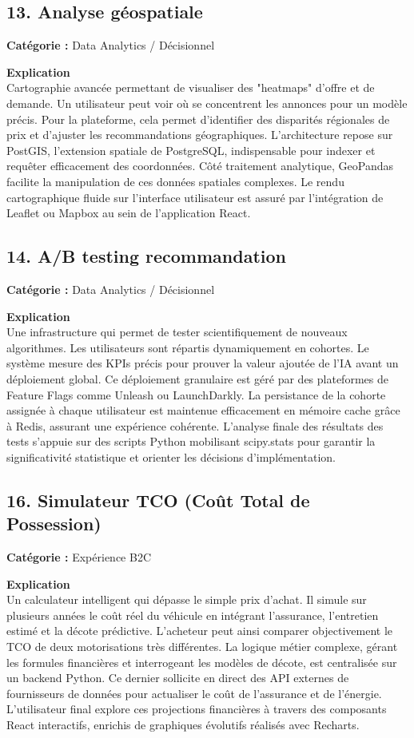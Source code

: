 \documentclass[11pt,a4paper]{article}
\begin{document}
\subsection{13. Analyse géospatiale}
\textbf{Catégorie :} Data Analytics / Décisionnel

\textbf{Explication}\\
Cartographie avancée permettant de visualiser des "heatmaps" d'offre et de demande. Un utilisateur peut voir où se concentrent les annonces pour un modèle précis. Pour la plateforme, cela permet d'identifier des disparités régionales de prix et d'ajuster les recommandations géographiques. L'architecture repose sur PostGIS, l'extension spatiale de PostgreSQL, indispensable pour indexer et requêter efficacement des coordonnées. Côté traitement analytique, GeoPandas facilite la manipulation de ces données spatiales complexes. Le rendu cartographique fluide sur l'interface utilisateur est assuré par l'intégration de Leaflet ou Mapbox au sein de l'application React.

\subsection{14. A/B testing recommandation}
\textbf{Catégorie :} Data Analytics / Décisionnel

\textbf{Explication}\\
Une infrastructure qui permet de tester scientifiquement de nouveaux algorithmes. Les utilisateurs sont répartis dynamiquement en cohortes. Le système mesure des KPIs précis pour prouver la valeur ajoutée de l'IA avant un déploiement global. Ce déploiement granulaire est géré par des plateformes de Feature Flags comme Unleash ou LaunchDarkly. La persistance de la cohorte assignée à chaque utilisateur est maintenue efficacement en mémoire cache grâce à Redis, assurant une expérience cohérente. L'analyse finale des résultats des tests s'appuie sur des scripts Python mobilisant scipy.stats pour garantir la significativité statistique et orienter les décisions d'implémentation.


\subsection{16. Simulateur TCO (Coût Total de Possession)}
\textbf{Catégorie :} Expérience B2C

\textbf{Explication}\\
Un calculateur intelligent qui dépasse le simple prix d'achat. Il simule sur plusieurs années le coût réel du véhicule en intégrant l'assurance, l'entretien estimé et la décote prédictive. L'acheteur peut ainsi comparer objectivement le TCO de deux motorisations très différentes. La logique métier complexe, gérant les formules financières et interrogeant les modèles de décote, est centralisée sur un backend Python. Ce dernier sollicite en direct des API externes de fournisseurs de données pour actualiser le coût de l'assurance et de l'énergie. L'utilisateur final explore ces projections financières à travers des composants React interactifs, enrichis de graphiques évolutifs réalisés avec Recharts.
\end{document}
